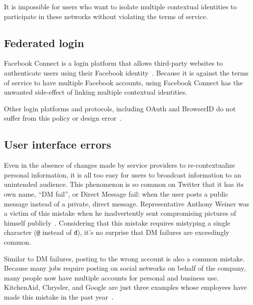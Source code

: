 \documentclass{llncs}
\begin{document}
It is impossible for users who want to isolate multiple contextual identities
to participate in these networks without violating the terms of service.

\subsection{Federated login}
Facebook Connect is a login platform that allows third-party websites to
authenticate users using their Facebook identity~\cite{fb_connect}. Because it
is against the terms of service to have multiple Facebook accounts, using
Facebook Connect has the unwanted side-effect of linking multiple contextual
identities.

Other login platforms and protocols, including OAuth and BrowserID
do not suffer from this policy or design error~\cite{browserid,oauth}.
\begin{comment}
(TODO:
this is actually kinda complicated -- yahoo, twitter, google allow multiple
accounts but the multi-login support is broken at google, not sure how it is
with others, oauth protocol supports multiple accounts, persona clearly
supports multiple accounts)
\end{comment}

\subsection{User interface errors}
Even in the absence of changes made by service providers to re-contextualize
personal information, it is all too easy for users to broadcast information to
an unintended audience. This phenomenon is so common on Twitter that it has its
own name, ``DM fail'', or Direct Message fail: when the user posts a public
message instead of a private, direct message. Representative Anthony Weiner was
a victim of this mistake when he inadvertently sent compromising pictures of
himself publicly~\cite{weiner}. Considering that this mistake requires
mistyping a single character (\texttt{@} instead of \texttt{d}), it's no
surprise that DM failures are exceedingly common.

Similar to DM failures, posting to the wrong account is also a common mistake.
Because many jobs require posting on social networks on behalf of the company,
many people now have multiple accounts for personal and business use.
KitchenAid, Chrysler, and Google are just three examples whose employees have
made this mistake in the past year~\cite{kitchenaid,chrysler,yegge}.
\end{document}
